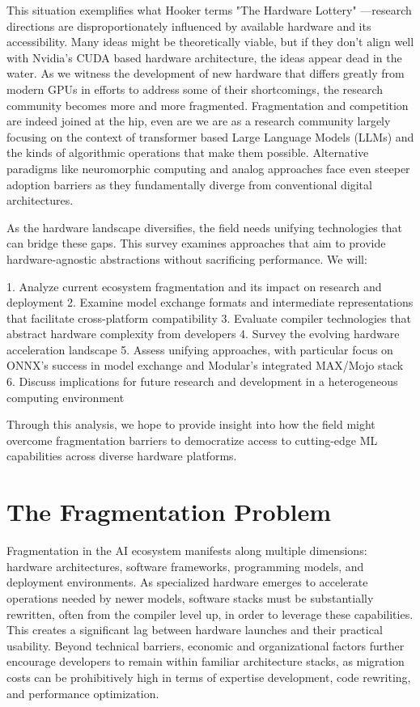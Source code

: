 \documentclass[manuscript,screen,review,format=acmsmall]{acmart}
\begin{document}
This situation exemplifies what Hooker terms "The Hardware Lottery" \cite{TheHardwareLottery}—research directions are disproportionately influenced by available hardware and its accessibility. Many ideas might be theoretically viable, but if they don't align well with Nvidia's CUDA based hardware architecture, the ideas appear dead in the water. As we witness the development of new hardware that differs greatly from modern GPUs in efforts to address some of their shortcomings, the research community becomes more and more fragmented. Fragmentation and competition are indeed joined at the hip, even are we are as a research community largely focusing on the context of transformer based Large Language Models (LLMs) and the kinds of algorithmic operations that make them possible. Alternative paradigms like neuromorphic computing and analog approaches face even steeper adoption barriers as they fundamentally diverge from conventional digital architectures.

As the hardware landscape diversifies, the field needs unifying technologies that can bridge these gaps. This survey examines approaches that aim to provide hardware-agnostic abstractions without sacrificing performance. We will:

1. Analyze current ecosystem fragmentation and its impact on research and deployment
2. Examine model exchange formats and intermediate representations that facilitate cross-platform compatibility
3. Evaluate compiler technologies that abstract hardware complexity from developers
4. Survey the evolving hardware acceleration landscape
5. Assess unifying approaches, with particular focus on ONNX's success in model exchange and Modular's integrated MAX/Mojo stack
6. Discuss implications for future research and development in a heterogeneous computing environment

Through this analysis, we hope to provide insight into how the field might overcome fragmentation barriers to democratize access to cutting-edge ML capabilities across diverse hardware platforms.

\section{The Fragmentation Problem}

Fragmentation in the AI ecosystem manifests along multiple dimensions: hardware architectures, software frameworks, programming models, and deployment environments. As specialized hardware emerges to accelerate operations needed by newer models, software stacks must be substantially rewritten, often from the compiler level up, in order to leverage these capabilities. This creates a significant lag between hardware launches and their practical usability. Beyond technical barriers, economic and organizational factors further encourage developers to remain within familiar architecture stacks, as migration costs can be prohibitively high in terms of expertise development, code rewriting, and performance optimization.
\end{document}
